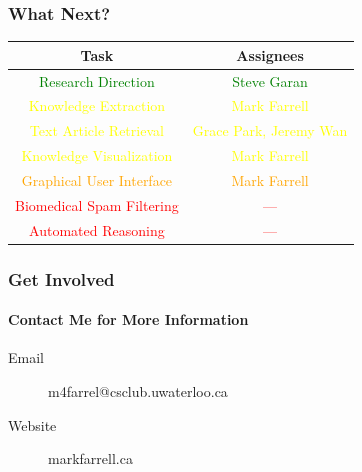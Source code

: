 \documentclass[mathserif]{beamer}
\begin{document}
\begin{frame}

\frametitle{What Next?}

\centering

\begin{tabular}{c | c}
Task &  Assignees\\
\hline
\textcolor{green}{Research Direction} & \textcolor{green}{Steve Garan} \\
\textcolor{yellow}{Knowledge Extraction} & \textcolor{yellow}{Mark Farrell} \\
\textcolor{yellow}{Text Article Retrieval} & \textcolor{yellow}{Grace Park, Jeremy Wan} \\
\textcolor{yellow}{Knowledge Visualization} & \textcolor{yellow}{Mark Farrell} \\
\textcolor{orange}{Graphical User Interface} & \textcolor{orange}{Mark Farrell} \\
\textcolor{red}{Biomedical Spam Filtering} & \textcolor{red}{---} \\
\textcolor{red}{Automated Reasoning} & \textcolor{red}{---} \\
\end{tabular}

\end{frame}

\begin{frame}

\frametitle{Get Involved}
\framesubtitle{Contact Me for More Information}

\begin{description}
\item[Email] m4farrel@csclub.uwaterloo.ca
\item[Website] markfarrell.ca
\end{description}

\end{frame}
\end{document}
